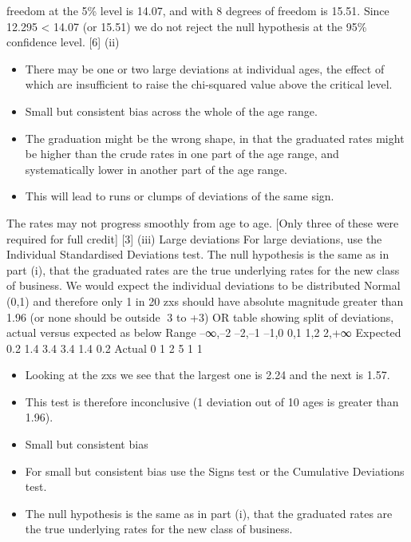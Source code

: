 \documentclass[a4paper,12pt]{article}
\begin{document}
freedom at the 5\% level is 14.07, and with 8 degrees of freedom is 15.51.
Since 12.295 < 14.07 (or 15.51)
we do not reject the null hypothesis at the 95\% confidence level. [6]
(ii) 
\begin{itemize}
    \item There may be one or two large deviations at individual ages, the effect of
which are insufficient to raise the chi-squared value above the critical level.
\item Small but consistent bias across the whole of the age range.
\item The graduation might be the wrong shape, in that the graduated rates might be
higher than the crude rates in one part of the age range, and systematically
lower in another part of the age range.
\item This will lead to runs or clumps of
deviations of the same sign.
\end{itemize}
The rates may not progress smoothly from age to age.
[Only three of these were required for full credit] [3]
(iii) Large deviations
For large deviations, use the Individual Standardised Deviations test.
The null hypothesis is the same as in part (i), that the graduated rates are the
true underlying rates for the new class of business.
We would expect the individual deviations to be distributed Normal (0,1)
and therefore only 1 in 20 zxs should have absolute magnitude greater than
1.96 (or none should be outside 3 to +3)
OR table showing split of deviations, actual versus expected
as below
Range –∞,–2 –2,–1 –1,0 0,1 1,2 2,+∞
Expected 0.2 1.4 3.4 3.4 1.4 0.2
Actual 0 1 2 5 1 1
\begin{itemize}
    \item Looking at the zxs we see that the largest one is 2.24 and the next is 1.57.
\item This test is therefore inconclusive (1 deviation out of 10 ages is greater
than 1.96).
\item Small but consistent bias
\item For small but consistent bias use the Signs test or the Cumulative Deviations
test.
\item The null hypothesis is the same as in part (i), that the graduated rates are the
true underlying rates for the new class of business.
\end{itemize}
\end{document}
